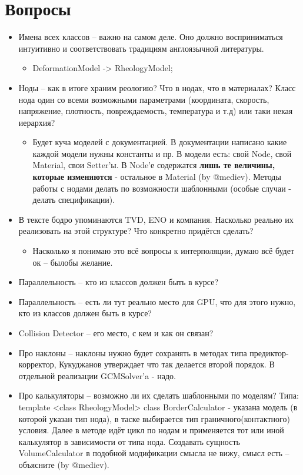 \documentclass[a4paper,12pt]{article}
\numberwithin{equation}{section}
\begin{document}
\section{Вопросы}
	\begin{itemize}
		\item{Имена всех классов -- важно на самом деле. Оно должно восприниматься интуитивно и соответствовать традициям англоязычной литературы.}
		\begin{itemize}
			\item{DeformationModel -> RheologyModel;}
		\end{itemize}
		\item{Ноды -- как в итоге храним реологию? Что в нодах, что в материалах? Класс нода один со всеми возможными параметрами (координата, скорость, напряжение, плотность, повреждаемость, температура и т.д) или таки некая иерархия?}
		\begin{itemize}
			\item{Будет куча моделей с документацией. В документации написано какие каждой модели нужны константы и пр. В модели есть: свой Node, свой Material, свои Setter'ы. В Node'е содержатся \textbf{лишь те величины, которые изменяются} - остальное в Material (by @mediev). Методы работы с нодами делать по возможности шаблонными (особые случаи - делать спецификации).}
		\end{itemize}
		\item{В тексте бодро упоминаются TVD, ENO и компания. Насколько реально их реализовать на этой структуре? Что конкретно придётся сделать?}
		\begin{itemize}
			\item{Насколько я понимаю это всё вопросы к интерполяции, думаю всё будет ок -- былобы желание.}
		\end{itemize}
		\item{Параллельность -- кто из классов должен быть в курсе?}
		\item{Параллельность -- есть ли тут реально место для GPU, что для этого нужно, кто из классов должен быть в курсе?}
		\item{Collision Detector -- его место, с кем и как он связан?}
		\item{Про наклоны -- наклоны нужно будет сохранять в методах типа предиктор-корректор, Кукуджанов утверждает что так делается второй порядок. В отдельной реализации GCMSolver'a - надо.}
		\item{Про калькуляторы -- возможно ли их сделать шаблонными по моделям? Типа: template <class RheologyModel> class BorderCalculator - указана модель (в которой указан тип нода), в таске выбирается тип граничного(контактного) условия. Далее в методе идёт цикл по нодам и применяется тот или иной калькулятор в зависимости от типа нода. Создавать сущность VolumeCalculator в подобной модификации смысла не вижу, смысл есть -- объясните (by @mediev).}
	\end{itemize}

\listoftodos
\end{document}
